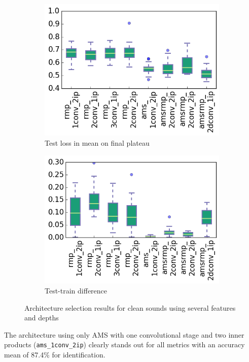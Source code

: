 \begin{figure}[htb]
\begin{subfigure}[t]{0.5\textwidth}
	\includegraphics[scale=0.5]{images-architecture-clean/mean_test_loss}
    \caption{Test loss in mean on final plateau}
	\label{fig:results:mean_test_loss}
\end{subfigure}%
\begin{subfigure}[t]{0.5\textwidth}
	\centering
	\includegraphics[scale=0.5]{images-architecture-clean/test_train_diff}
    \caption{Test-train difference}
	\label{fig:results:test_train_diff}
\end{subfigure}
\caption{Architecture selection results for clean sounds using several features and depths}
\end{figure}
The architecture using only AMS with one convolutional stage and two inner products (\verb+ams_1conv_2ip+) clearly stands out for all metrics with an accuracy mean of 87.4\% for identification.


